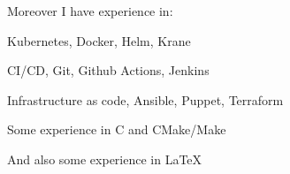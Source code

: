 Moreover I have experience in:
\begin{bulist}
  \item Kubernetes, Docker, Helm, Krane
  \item CI/CD, Git, Github Actions, Jenkins
  \item Infrastructure as code, Ansible, Puppet, Terraform
  \item Some experience in C and CMake/Make
\end{bulist}
And also some experience in \LaTeX
